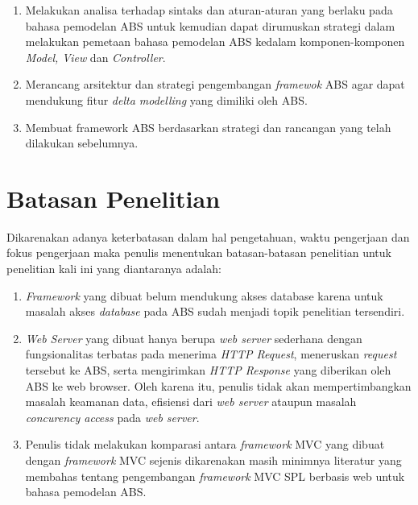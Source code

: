 \begin{enumerate}
    \item Melakukan analisa terhadap sintaks dan aturan-aturan yang berlaku pada bahasa pemodelan ABS untuk kemudian dapat dirumuskan strategi dalam melakukan pemetaan bahasa pemodelan ABS kedalam komponen-komponen \textit{Model, View} dan \textit{Controller}.
    \item Merancang arsitektur dan strategi pengembangan \textit{framewok} ABS agar dapat mendukung fitur \textit{delta modelling} yang dimiliki oleh ABS.
    \item Membuat framework ABS berdasarkan strategi dan rancangan yang telah dilakukan sebelumnya.
\end{enumerate}

\section{Batasan Penelitian}

Dikarenakan adanya keterbatasan dalam hal pengetahuan, waktu pengerjaan dan fokus pengerjaan maka penulis menentukan batasan-batasan penelitian untuk penelitian kali ini yang diantaranya adalah:

\begin{enumerate}
    \item \textit{Framework} yang dibuat belum mendukung akses database karena untuk masalah akses \textit{database} pada ABS sudah menjadi topik penelitian tersendiri.
    \item \textit{Web Server} yang dibuat hanya berupa \textit{web server} sederhana dengan fungsionalitas terbatas pada menerima \textit{HTTP Request}, meneruskan \textit{request} tersebut ke ABS, serta mengirimkan \textit{HTTP Response} yang diberikan oleh ABS ke web browser. Oleh karena itu, penulis tidak akan mempertimbangkan masalah keamanan data, efisiensi dari \textit{web server} ataupun masalah \textit{concurency access} pada \textit{web server}.
    \item Penulis tidak melakukan komparasi antara \textit{framework} MVC yang dibuat dengan \textit{framework} MVC sejenis dikarenakan masih minimnya literatur yang membahas tentang pengembangan \textit{framework} MVC SPL berbasis web untuk bahasa pemodelan ABS.
\end{enumerate}


